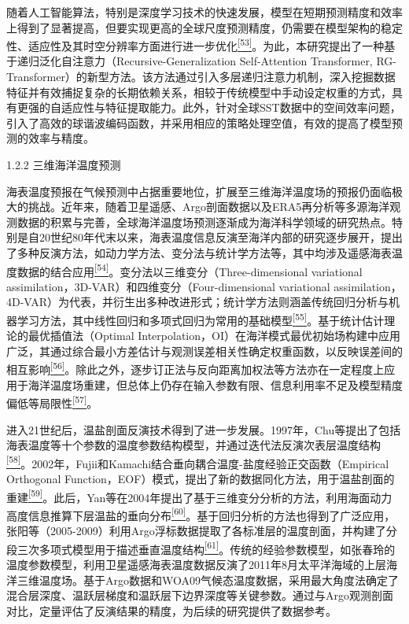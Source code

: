 \documentclass[
  12pt,
]{article}
\begin{document}
随着人工智能算法，特别是深度学习技术的快速发展，模型在短期预测精度和效率上得到了显著提高，但要实现更高的全球尺度预测精度，仍需要在模型架构的稳定性、适应性及其时空分辨率方面进行进一步优化\hyperref[_Ref165148613]{\textsuperscript{{[}53{]}}}。为此，本研究提出了一种基于递归泛化自注意力（Recursive-Generalization
Self-Attention Transformer,
RG-Transformer）的新型方法。该方法通过引入多层递归注意力机制，深入挖掘数据特征并有效捕捉复杂的长期依赖关系，相较于传统模型中手动设定权重的方式，具有更强的自适应性与特征提取能力。此外，针对全球SST数据中的空间效率问题，引入了高效的球谐波编码函数，并采用相应的策略处理空值，有效的提高了模型预测的效率与精度。

\protect{}\label{_Toc2021387096}{}1.2.2 三维海洋温度预测

海表温度预报在气候预测中占据重要地位，扩展至三维海洋温度场的预报仍面临极大的挑战。近年来，随着卫星遥感、Argo剖面数据以及ERA5再分析等多源海洋观测数据的积累与完善，全球海洋温度场预测逐渐成为海洋科学领域的研究热点。特别是自20世纪80年代末以来，海表温度信息反演至海洋内部的研究逐步展开，提出了多种反演方法，如动力学方法、变分法与统计学方法等，其中均涉及遥感海表温度数据的结合应用\hyperref[_Ref165148613]{\textsuperscript{{[}54{]}}}。变分法以三维变分（Three-dimensional
variational assimilation，3D-VAR）和四维变分（Four-dimensional
variational
assimilation，4D-VAR）为代表，并衍生出多种改进形式；统计学方法则涵盖传统回归分析与机器学习方法，其中线性回归和多项式回归为常用的基础模型\hyperref[_Ref165148613]{\textsuperscript{{[}55{]}}}。基于统计估计理论的最优插值法（Optimal
Interpolation，OI）在海洋模式最优初始场构建中应用广泛，其通过综合最小方差估计与观测误差相关性确定权重函数，以反映误差间的相互影响\hyperref[_Ref165148613]{\textsuperscript{{[}56{]}}}。除此之外，逐步订正法与反向距离加权法等方法亦在一定程度上应用于海洋温度场重建，但总体上仍存在输入参数有限、信息利用率不足及模型精度偏低等局限性\hyperref[_Ref165148613]{\textsuperscript{{[}57{]}}}。

进入21世纪后，温盐剖面反演技术得到了进一步发展。1997年，Chu等提出了包括海表温度等十个参数的温度参数结构模型，并通过迭代法反演次表层温度结构\hyperref[_Ref165148613]{\textsuperscript{{[}58{]}}}。2002年，Fujii和Kamachi结合垂向耦合温度-盐度经验正交函数（Empirical
Orthogonal
Function，EOF）模式，提出了新的数据同化方法，用于温盐剖面的重建\hyperref[_Ref165148613]{\textsuperscript{{[}59{]}}}。此后，Yan等在2004年提出了基于三维变分分析的方法，利用海面动力高度信息推算下层温盐的垂向分布\hyperref[_Ref165148613]{\textsuperscript{{[}60{]}}}。基于回归分析的方法也得到了广泛应用，张阳等（2005-2009）利用Argo浮标数据提取了各标准层的温度剖面，并构建了分段三次多项式模型用于描述垂直温度结构\hyperref[_Ref165148613]{\textsuperscript{{[}61{]}}}。传统的经验参数模型，如张春玲的温度参数模型，利用卫星遥感海表温度数据反演了2011年8月太平洋海域的上层海洋三维温度场。基于Argo数据和WOA09气候态温度数据，采用最大角度法确定了混合层深度、温跃层梯度和温跃层下边界深度等关键参数。通过与Argo观测剖面对比，定量评估了反演结果的精度，为后续的研究提供了数据参考。
\end{document}
